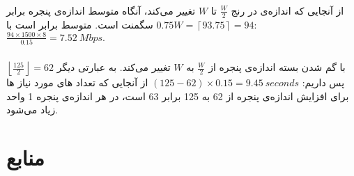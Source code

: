 \documentclass{article}
\begin{document}
\subsubsection{}
از آنجایی که اندازه‌ی  در رنج 
$
\frac{W}{2}
$
تا 
$
W
$
تغییر می‌کند، آنگاه متوسط اندازه‌ی پنجره برابر 
$
0.75W = \left\lceil 93.75 \right\rceil = 94
$
سگمنت است. متوسط  برابر است با:
$
\frac{94\times1500\times8}{0.15}=7.52\:Mbps.
$

\subsubsection{}
با گم شدن بسته اندازه‌ی پنجره از $\frac{W}{2}$ به $W$ تغییر می‌کند. به عبارتی دیگر 
$
\left\lfloor \frac{125}{2} \right\rfloor=62
$
پس داریم:
$
(125 - 62)\times 0.15 = 9.45\:seconds
$
از آنجایی که تعداد های مورد نیاز ها برای افزایش اندازه‌ی پنجره از 62 به 125  برابر 63 است، در هر  اندازه‌ی پنجره 1 واحد زیاد می‌شود.

\section*{منابع}
\renewcommand{\section}[2]{}%
\begin{thebibliography}{99} %


\begin{LTRitems}

\resetlatinfont

\end{LTRitems}

\end{thebibliography}
\end{document}
